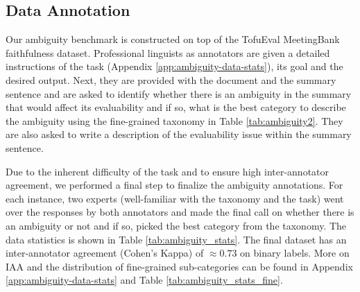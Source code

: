 % 

\subsection{Data Annotation}\label{sec:data_annotation}
Our ambiguity benchmark is constructed on top of the TofuEval MeetingBank \cite{tang2024tofueval} faithfulness dataset. 
Professional linguists as annotators are given a detailed instructions of the task (Appendix \ref{app:ambiguity-data-stats}), its goal and the desired output. 
% 
Next, they are provided with the document and the summary sentence and are asked to identify whether there is an ambiguity in the summary that would affect its evaluability and if so, what is the best category to describe the ambiguity using the fine-grained taxonomy in Table \ref{tab:ambiguity2}. They are also asked to write a description of the evaluability issue within the summary sentence.



Due to the inherent difficulty of the task and to ensure high inter-annotator agreement, we performed a final step to finalize the ambiguity annotations. For each instance, two experts (well-familiar with the taxonomy and the task) went over the responses by both annotators and made the final call on whether there is an ambiguity or not and if so, picked the best category from the taxonomy. 
The data statistics is shown in Table \ref{tab:ambiguity_stats}. The final dataset has an inter-annotator agreement (Cohen's Kappa) of $\approx0.73$ on binary labels.
More on IAA and the distribution of fine-grained sub-categories can be found in Appendix \ref{app:ambiguity-data-stats} and Table \ref{tab:ambiguity_stats_fine}.



